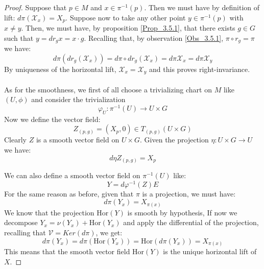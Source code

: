 \documentclass[12pt,a4paper]{report}
\theoremstyle{definition}
\theoremstyle{Theorem}
\theoremstyle{definition}
\theoremstyle{definition}
\begin{document}
	\begin{proof}
		Suppose that $p\in M$ and $x\in\pi^{-1}(p)$. Then we must have by definition of lift: $d\pi(\mathcal{X}_{x})=X_p$. Suppose now to take any other point $y\in\pi^{-1}(p)$ with $x\neq y$. Then, we must have, by proposition \ref{Prop_3.5.1}, that there exists $g\in G$ such that $y=dr_{g}x=x\cdot g$. Recalling that, by observation \ref{Obs_3.5.1}, $\pi\circ r_{g}=\pi$ we have:
		$$d\pi(dr_{g}(\mathcal{X}_{x}))=d\pi\circ dr_{g}(\mathcal{X}_{x})=d\pi\mathcal{X}_{x}=d\pi\mathcal{X}_{y}$$
		By uniqueness of the horizontal lift, $\mathcal{X}_{x}=\mathcal{X}_{y}$ and this proves right-invariance.\\
		\\
		As for the smoothness, we first of all choose a trivializing chart on $M$ like $(U,\phi)$ and consider the trivialization 
		$$\varphi_U:\pi^{-1}(U)\rightarrow U\times G$$
		Now we define the vector field:
		$$Z_{(p,g)}=(X_p,0)\in T_{(p,g)}(U\times G)$$
		Clearly $Z$ is a smooth vector field on $U\times G$. Given the projection $\eta:U\times G\rightarrow U$ we have:
		$$d\eta Z_{(p,g)}=X_p$$
		\begin{comment}
			To see this, note that $d\eta:T(U\times G)\rightarrow TU$ and so we get: $d\eta(Z)\in TU$ is a vector field. In particular, by definition of differential, we must have for any $(p,g)\in U\times G$:
			$$d\eta_{(p,g)}(Z_{(p,g)})f=Z_{(p,g)}(f\circ \eta_{(p,g)})$$
			And since $\eta$ projects the points from $U\times G$ to $U$, we get:
			$$d\eta_{(p,g)}(Z_{(p,g)})=X_p$$
		\end{comment}
		We can also define a smooth vector field on $\pi^{-1}(U)$ like:
		$$Y=d\varphi^{-1}(Z)E$$
		For the same reason as before, given that $\pi$ is a projection, we must have:
		$$d\pi(Y_{x})=X_{\pi(x)}$$
		We know that the projection $\mathrm{Hor}(Y)$ is smooth by hypothesis, If now we decompose $Y_{x}=\nu(Y_{x})+\mathrm{Hor}(Y_{x})$ and apply the differential of the projection, recalling that $\mathcal{V}=Ker(d\pi)$, we get:
		$$d\pi(Y_{x})=d\pi(\mathrm{Hor}(Y_{x}))=\mathrm{Hor}(d\pi(Y_{x}))=X_{\pi(x)}$$
		This means that the smooth vector field $\mathrm{Hor}(Y)$ is the unique horizontal lift of $X$.
	\end{proof}
\end{document}
